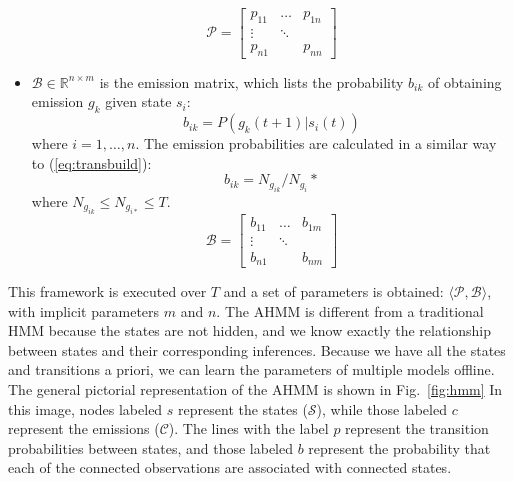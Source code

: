 \documentclass[letterpaper, 10 pt, conference]{ieeeconf}  %
\newcommand\NB[1]{$\spadesuit$\footnote{NB: #1}}
\begin{document}
\begin{itemize}
\begin{equation}
            \mathcal{P} = 
                    \begin{bmatrix}
                        p_{11} & \dots & p_{1n} \\
                        \vdots & \ddots & \\
                        p_{n1} &    & p_{nn}
                    \end{bmatrix}
        \end{equation}
    \item $\mathcal{B}\in\mathbb{R}^{n\times m}$ is the emission matrix, which lists the probability $b_{ik}$ of obtaining emission $g_k$ given state $s_i$:
        \begin{equation} \label{eq:obsref}
            b_{ik} = P(g_k(t+1) \vert s_i(t))
        \end{equation}
        where $i = 1,\ldots,n$. The emission probabilities are calculated in a similar way to (\ref{eq:transbuild}):
        \begin{equation} \label{eq:obsbuild}
            b_{ik} = N_{g_{ik}}/N_{g_{i}}*
        \end{equation} 
        where $N_{g_{ik}} \leq N_{g_{i*}} \leq T$.
        \begin{equation}
            \mathcal{B} = 
                    \begin{bmatrix}
                        b_{11} & \dots & b_{1m} \\
                        \vdots & \ddots & \\
                        b_{n1} &    & b_{nm}
                    \end{bmatrix}
        \end{equation}
\end{itemize}

This framework is executed over $T$ and a set of parameters is obtained: $\langle \mathcal{P}, \mathcal{B} \rangle$, with implicit parameters $m$ and $n$. The AHMM is different from a traditional HMM because the states are not hidden, and we know exactly the relationship
between states and their corresponding inferences. Because we have all the states and transitions a priori, we can learn the parameters of multiple models offline. %
The general pictorial representation of the AHMM is shown in Fig.~\ref{fig:hmm} %
In this image, nodes labeled $s$ represent the states ($\mathcal{S}$), while those labeled $c$ represent the emissions ($\mathcal{C}$). The lines with the label $p$ represent the transition probabilities between states, and those labeled $b$ represent the probability that each of the connected observations are associated with connected states.
\end{document}
